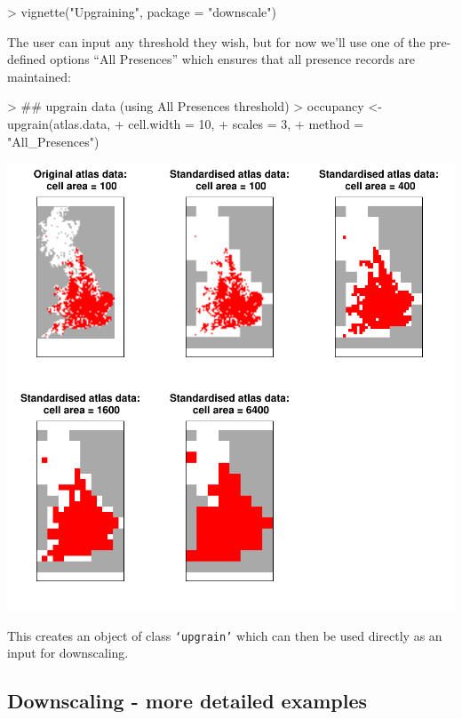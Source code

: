 \documentclass{article}[12pt, a4paper]
\begin{document}
\begin{Schunk}
\begin{Sinput}
>   vignette("Upgraining", package = "downscale")
\end{Sinput}
\end{Schunk}

The user can input any threshold they wish, but for now we’ll use one of the pre-defined options “All Presences” which ensures that all presence records are maintained:

\begin{Schunk}
\begin{Sinput}
> ## upgrain data (using All Presences threshold)
> occupancy <- upgrain(atlas.data,
+                      cell.width = 10,
+                      scales = 3,
+                      method = "All_Presences")
\end{Sinput}
\end{Schunk}
\includegraphics{Downscaling-downscale11}

This creates an object of class \texttt{‘upgrain’} which can then be used directly as an input for downscaling.

\subsection{Downscaling - more detailed examples}
\end{document}
